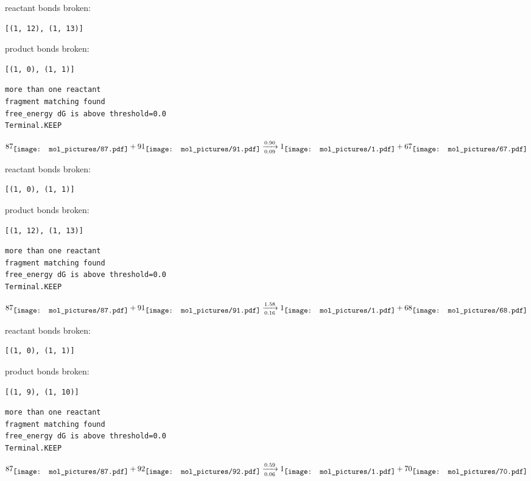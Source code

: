 \documentclass{article}
\begin{document}
reactant bonds broken:\begin{verbatim}
[(1, 12), (1, 13)]
\end{verbatim}
product bonds broken:\begin{verbatim}
[(1, 0), (1, 1)]
\end{verbatim}




\vspace{1cm}
\begin{verbatim}
more than one reactant
fragment matching found
free_energy dG is above threshold=0.0
Terminal.KEEP
\end{verbatim}
$$
87
\raisebox{-.5\height}{\texttt{[image: mol\_pictures/87.pdf]}}
+
91
\raisebox{-.5\height}{\texttt{[image: mol\_pictures/91.pdf]}}
\xrightarrow[0.09]{0.90}
1
\raisebox{-.5\height}{\texttt{[image: mol\_pictures/1.pdf]}}
+
67
\raisebox{-.5\height}{\texttt{[image: mol\_pictures/67.pdf]}}
$$


reactant bonds broken:\begin{verbatim}
[(1, 0), (1, 1)]
\end{verbatim}
product bonds broken:\begin{verbatim}
[(1, 12), (1, 13)]
\end{verbatim}




\vspace{1cm}
\begin{verbatim}
more than one reactant
fragment matching found
free_energy dG is above threshold=0.0
Terminal.KEEP
\end{verbatim}
$$
87
\raisebox{-.5\height}{\texttt{[image: mol\_pictures/87.pdf]}}
+
91
\raisebox{-.5\height}{\texttt{[image: mol\_pictures/91.pdf]}}
\xrightarrow[0.16]{1.58}
1
\raisebox{-.5\height}{\texttt{[image: mol\_pictures/1.pdf]}}
+
68
\raisebox{-.5\height}{\texttt{[image: mol\_pictures/68.pdf]}}
$$


reactant bonds broken:\begin{verbatim}
[(1, 0), (1, 1)]
\end{verbatim}
product bonds broken:\begin{verbatim}
[(1, 9), (1, 10)]
\end{verbatim}




\vspace{1cm}
\begin{verbatim}
more than one reactant
fragment matching found
free_energy dG is above threshold=0.0
Terminal.KEEP
\end{verbatim}
$$
87
\raisebox{-.5\height}{\texttt{[image: mol\_pictures/87.pdf]}}
+
92
\raisebox{-.5\height}{\texttt{[image: mol\_pictures/92.pdf]}}
\xrightarrow[0.06]{0.59}
1
\raisebox{-.5\height}{\texttt{[image: mol\_pictures/1.pdf]}}
+
70
\raisebox{-.5\height}{\texttt{[image: mol\_pictures/70.pdf]}}
$$
\end{document}
